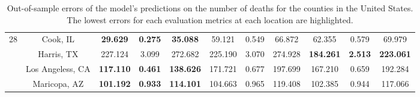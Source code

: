 \begin{landscape}
\begin{table}[!htb]
\begin{tabular}{| c | c | c | c | c | c | c | c | c | c | c |}
        \multirow{4}{*}{28}
            & Cook, IL & \textbf{29.629} & \textbf{0.275} & \textbf{35.088} & 59.121 & 0.549 & 66.872 & 62.355 & 0.579 & 69.979 \\
            & Harris, TX & 227.124 & 3.099 & 272.682 & 225.190 & 3.070 & 274.928 & \textbf{184.261} & \textbf{2.513} & \textbf{223.061} \\
            & Los Angeless, CA & \textbf{117.110} & \textbf{0.461} & \textbf{138.626} & 171.721 & 0.677 & 197.699 & 167.210 & 0.659 & 192.284 \\
            & Maricopa, AZ & \textbf{101.192} & \textbf{0.933} & \textbf{114.101} & 104.663 & 0.965 & 119.408 & 102.385 & 0.944 & 117.066 \\ \hline
    \end{tabular}
    \caption[Out-of-sample-errors for the number of deaths for US counties]{Out-of-sample errors of the model's predictions on the number of deaths for the counties in the United States. The lowest errors for each evaluation metrics at each location are highlighted.}
    \label{tab:errors-us-counties-deaths}
\end{table}
\end{landscape}

